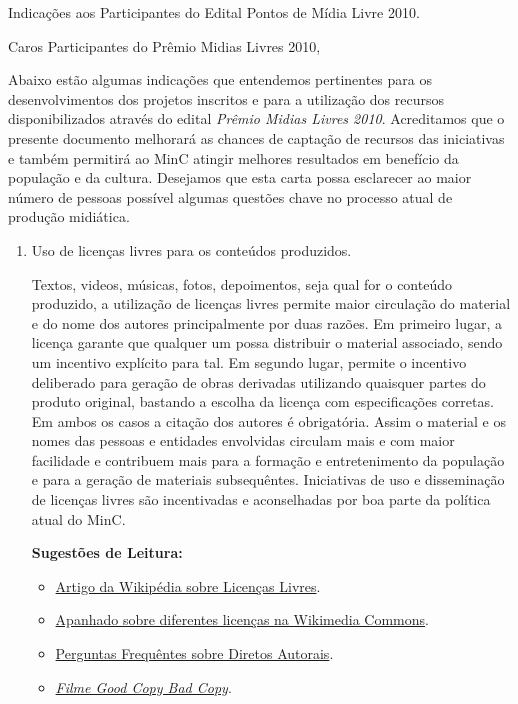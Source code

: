 \documentclass{letter}[20pt]
\begin{document}
\begin{letter}{Indicações aos Participantes do Edital Pontos de Mídia Livre 2010.}

\opening{Caros Participantes do Prêmio Midias Livres 2010,}

Abaixo estão algumas indicações que entendemos pertinentes para os desenvolvimentos dos projetos inscritos e para a utilização dos recursos disponibilizados através do edital \emph{Prêmio Midias Livres 2010}. Acreditamos que o presente documento melhorará as chances de captação de recursos das iniciativas e também permitirá ao MinC atingir melhores resultados em benefício da população e da cultura. Desejamos que esta carta possa esclarecer ao maior número de pessoas possível algumas questões chave no processo atual de produção midiática.
  \vspace{1cm}
\begin{enumerate}
  \item Uso de licenças livres para os conteúdos produzidos.

    Textos, videos, músicas, fotos, depoimentos, seja qual for o conteúdo produzido, a utilização de licenças livres permite maior circulação do material e do nome dos autores principalmente por duas razões. Em primeiro lugar, a licença garante que qualquer um possa distribuir o material associado, sendo um incentivo explícito para tal. Em segundo lugar, permite o incentivo deliberado para geração de obras derivadas utilizando quaisquer partes do produto original, bastando a escolha da licença com especificações corretas. Em ambos os casos a citação dos autores é obrigatória. Assim o material e os nomes das pessoas e entidades envolvidas circulam mais e com maior facilidade e contribuem mais para a formação e entretenimento da população e para a geração de materiais subsequêntes. Iniciativas de uso e disseminação de licenças livres são incentivadas e aconselhadas por boa parte da política atual do MinC.

    {\bf Sugestões de Leitura:}
    \begin{itemize}%
      \renewcommand{\labelitemi}{$\rightarrow$}
      \item \href{http://pt.wikipedia.org/wiki/Licen\%C3\%A7a\_livre}{Artigo da Wikipédia sobre Licenças Livres}.
      \item \href{http://commons.wikimedia.org/wiki/Commons:Marcas\_de\_direitos\_autorais}{Apanhado sobre diferentes licenças na Wikimedia Commons}.
      \item \href{http://estudiolivre.org/tiki-index.php?page=faq+direitos+autorais}{Perguntas Frequêntes sobre Diretos Autorais}.
      \item \href{http://www.goodcopybadcopy.net/}{\emph{Filme Good Copy Bad Copy}}.
    \end{itemize}



\end{enumerate}
\end{letter}
\end{document}
